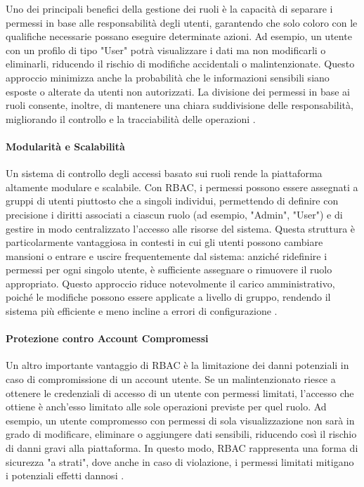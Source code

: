 Uno dei principali benefici della gestione dei ruoli è la capacità di separare i permessi in base alle responsabilità degli utenti, garantendo che solo coloro con le qualifiche necessarie possano eseguire determinate azioni. Ad esempio, un utente con un profilo di tipo "User" potrà visualizzare i dati ma non modificarli o eliminarli, riducendo il rischio di modifiche accidentali o malintenzionate. Questo approccio minimizza anche la probabilità che le informazioni sensibili siano esposte o alterate da utenti non autorizzati. La divisione dei permessi in base ai ruoli consente, inoltre, di mantenere una chiara suddivisione delle responsabilità, migliorando il controllo e la tracciabilità delle operazioni \cite{sandhu1996role}.

\paragraph{Modularità e Scalabilità}
Un sistema di controllo degli accessi basato sui ruoli rende la piattaforma altamente modulare e scalabile. Con RBAC, i permessi possono essere assegnati a gruppi di utenti piuttosto che a singoli individui, permettendo di definire con precisione i diritti associati a ciascun ruolo (ad esempio, "Admin", "User") e di gestire in modo centralizzato l'accesso alle risorse del sistema. Questa struttura è particolarmente vantaggiosa in contesti in cui gli utenti possono cambiare mansioni o entrare e uscire frequentemente dal sistema: anziché ridefinire i permessi per ogni singolo utente, è sufficiente assegnare o rimuovere il ruolo appropriato. Questo approccio riduce notevolmente il carico amministrativo, poiché le modifiche possono essere applicate a livello di gruppo, rendendo il sistema più efficiente e meno incline a errori di configurazione \cite{ferraiolo2001role}.

\paragraph{Protezione contro Account Compromessi}
Un altro importante vantaggio di RBAC è la limitazione dei danni potenziali in caso di compromissione di un account utente. Se un malintenzionato riesce a ottenere le credenziali di accesso di un utente con permessi limitati, l’accesso che ottiene è anch’esso limitato alle sole operazioni previste per quel ruolo. Ad esempio, un utente compromesso con permessi di sola visualizzazione non sarà in grado di modificare, eliminare o aggiungere dati sensibili, riducendo così il rischio di danni gravi alla piattaforma. In questo modo, RBAC rappresenta una forma di sicurezza "a strati", dove anche in caso di violazione, i permessi limitati mitigano i potenziali effetti dannosi \cite{bonneau2012quest}.

